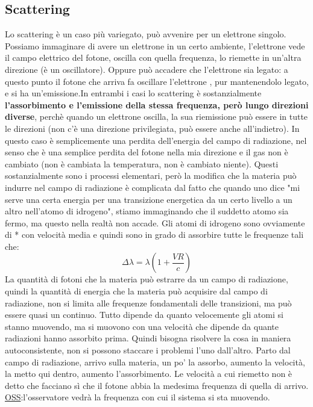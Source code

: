 \documentclass[a4paper,11pt]{article}
\begin{document}
\subsection{Scattering}
Lo scattering è un caso più variegato, può avvenire per un elettrone singolo. Possiamo immaginare di avere un elettrone in un certo ambiente, l'elettrone vede il campo elettrico del fotone, oscilla con quella frequenza, lo riemette in un'altra direzione (è un oscillatore). Oppure può accadere che l'elettrone sia legato: a questo punto il fotone che arriva fa oscillare l'elettrone , pur mantenendolo legato, e si ha un'emissione.In entrambi i casi lo scattering è sostanzialmente \textbf{l'assorbimento e l'emissione della stessa frequenza, però lungo direzioni diverse}, perchè quando un elettrone oscilla, la sua riemissione può essere in tutte le direzioni (non c'è una direzione privilegiata, può essere anche all'indietro). In questo caso è semplicemente una perdita dell'energia del campo di radiazione, nel senso che è una semplice perdita del fotone nella mia direzione e il gas non è cambiato (non è cambiata la temperatura, non è cambiato niente).
\newline
Questi sostanzialmente sono i processi elementari, però la modifica che la materia può indurre nel campo di radiazione è complicata dal fatto che quando uno dice "mi serve una certa energia per una transizione energetica da un certo livello a un altro nell'atomo di idrogeno", stiamo immaginando che il suddetto atomo sia fermo, ma questo nella realtà non accade. Gli atomi di idrogeno sono ovviamente di * con velocità media e quindi sono in grado di assorbire tutte le frequenze tali che:
$$
\Delta\lambda=\lambda(1+\frac{VR}{c})
$$
La quantità di fotoni che la materia può estrarre da un campo di radiazione, quindi la quantità di energia che la materia può acquisire dal campo di radiazione, non si limita alle frequenze fondamentali delle transizioni, ma può essere quasi un continuo. Tutto dipende da quanto velocemente gli atomi si stanno muovendo, ma si muovono con una velocità che dipende da quante radiazioni hanno assorbito prima. Quindi bisogna risolvere la cosa in maniera autoconsistente, non si possono staccare i problemi l'uno dall'altro. Parto dal campo di radiazione, arrivo sulla materia, un po' la assorbo, aumento la velocità, la metto qui dentro, aumento l'assorbimento. Le velocità a cui riemetto non è detto che facciano sì che il fotone abbia la medesima frequenza di quella di arrivo.
\newline
\underline{OSS}:l'osservatore vedrà la frequenza con cui il sistema si sta muovendo.
\end{document}
